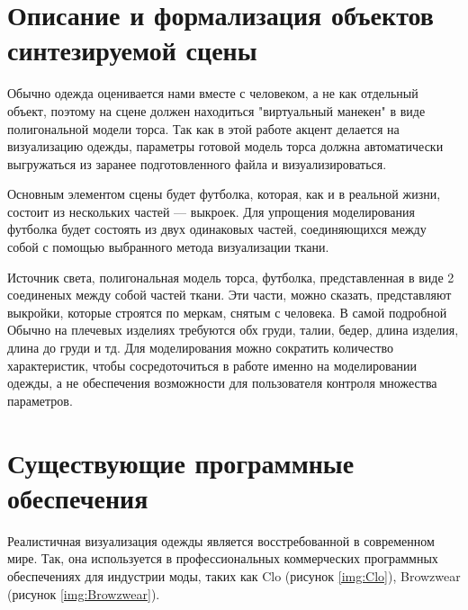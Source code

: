 \section{Описание и формализация объектов синтезируемой сцены}

Обычно одежда оценивается нами вместе с человеком, а не как отдельный объект,
поэтому на сцене должен находиться "виртуальный манекен" в виде полигональной
модели торса. Так как в этой работе акцент делается на визуализацию одежды,
параметры готовой модель торса должна автоматически выгружаться из заранее
подготовленного файла и визуализироваться.

Основным элементом сцены будет футболка, которая, как и в реальной жизни,
состоит из нескольких частей --- выкроек. Для упрощения моделирования футболка
будет состоять из двух одинаковых частей, соединяющихся между собой с помощью
выбранного метода визуализации ткани.

Источник света, полигональная модель торса, футболка, представленная в виде 2
соединеных между собой частей ткани. Эти части, можно сказать, представляют
выкройки, которые строятся по меркам, снятым с человека. В самой подробной
Обычно на плечевых изделиях требуются обх груди, талии, бедер, длина изделия,
длина до груди и тд.  Для моделирования можно сократить количество
характеристик, чтобы сосредоточиться в работе именно на моделировании одежды, а
не обеспечения возможности для пользователя контроля множества параметров.



\section{Существующие программные обеспечения}

Реалистичная визуализация одежды является восстребованной в современном мире.
Так, она используется в профессиональных коммерческих программных обеспечениях
для индустрии моды, таких как Clo\cite{site01} (рисунок \ref{img:Clo}),
Browzwear\cite{site02} (рисунок \ref{img:Browzwear}).

